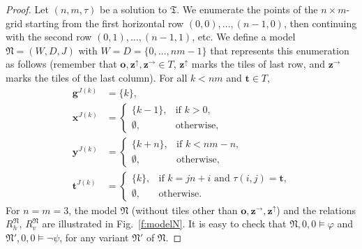 \documentclass[10pt,a4paper]{amsart}
\theoremstyle{plain}
\theoremstyle{definition}
\newcommand{\tiling}{\mathfrak T}
\newcommand{\bbvarup}{\Zvar^\uparrow}
\newcommand{\bbvarright}{\Zvar^\to}
\newcommand{\fform}[1]{\boldsymbol{#1}}
\newcommand{\gvar}{\fform{g}}
\newcommand{\tvar}{\fform{t}}
\newcommand{\xvar}{\fform{x}}
\newcommand{\yvar}{\fform{y}}
\newcommand{\ovar}{\fform{o}}
\newcommand{\Zvar}{\fform{z}}
\begin{document}
\begin{proof}
	Let $(n,m,\tau)$ be a solution to $\tiling$. We enumerate the points of the $n\times m$-grid starting from the first horizontal row $(0,0),\dots, (n-1,0)$, then continuing with the second row $(0,1),\dots,(n-1,1)$, etc. 
	We define a model $\mathfrak{N}=(W,D,J)$ with $W=D=\{0,\dots,nm-1\}$ that represents this enumeration as follows (remember that $\ovar,\bbvarup,\bbvarright\in T$, $\bbvarup$ marks the tiles of last row, and  $\bbvarright$ marks the tiles of the last column). 
	For all $k<nm$ and $\tvar\in T$, 
	\begin{align}
		\label{Nfirst}
		\gvar^{J(k)} & =\{k\},\\
	\xvar^{J(k)} & = \left\{
		\begin{array}{ll}
			\{k-1\},  & \mbox{if $k>0$,}\\[3pt]
			\emptyset, &\mbox{otherwise,}
		\end{array}
		\right.\\
	\yvar^{J(k)} & = \left\{
		\begin{array}{ll}
			\{k+n\},  & \mbox{if $k<nm-n$,}\\[3pt]
			\emptyset, &\mbox{otherwise,}
		\end{array}
		\right.\\	
		\label{Nlast}
		\tvar^{J(k)} & = \left\{
		\begin{array}{ll}
			\{k\},  & \mbox{if $k=jn+i$ and $\tau(i,j)=\tvar$,}\\[3pt]
			\emptyset, &\mbox{otherwise.}
		\end{array}
		\right.
	\end{align}
	For $n=m=3$, the model $\mathfrak N$ (without tiles other than $\ovar,\bbvarright,\bbvarup$) and the relations $R_h^\mathfrak N$, $R_v^\mathfrak N$ are illustrated in Fig.~\ref{f:modelN}.
	It is easy to check that $\mathfrak{N},0,0\models \varphi$ and $\mathfrak{N}',0,0\models \neg\psi$, for any variant $\mathfrak{N}'$ of $\mathfrak{N}$. 
	

\end{proof}
\end{document}
